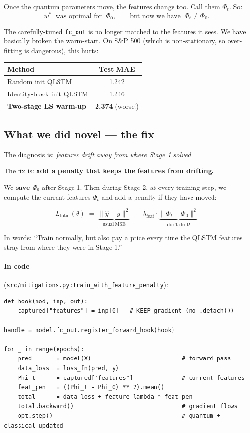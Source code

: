 \documentclass[11pt,a4paper]{article}
\begin{document}
Once the quantum parameters move, the features change too. Call them $\Phi_t$. So:
\[
  w^* \;\;\text{was optimal for}\;\; \Phi_0, \qquad \text{but now we have}\;\; \Phi_t \neq \Phi_0.
\]

The carefully-tuned \texttt{fc\_out} is no longer matched to the features it sees. We have basically broken the warm-start. On S\&P 500 (which is non-stationary, so over-fitting is dangerous), this hurts:

\begin{center}
\begin{tabular}{@{}lc@{}}
\toprule
\textbf{Method} & \textbf{Test MAE} \\
\midrule
Random init QLSTM         & 1.242 \\
Identity-block init QLSTM & 1.246 \\
\textbf{Two-stage LS warm-up} & \textbf{2.374} \;(worse!) \\
\bottomrule
\end{tabular}
\end{center}

\subsection{What we did novel --- the fix}

The diagnosis is: \emph{features drift away from where Stage 1 solved.}

The fix is: \textbf{add a penalty that keeps the features from drifting.}

We \textbf{save $\Phi_0$} after Stage 1. Then during Stage 2, at every training step, we compute the current features $\Phi_t$ and add a penalty if they have moved:

\[
  \boxed{\;
  L_{\text{total}}(\theta) \;=\;
  \underbrace{\|\hat y - y\|^2}_{\text{usual MSE}}
  \;+\;
  \lambda_{\text{feat}} \cdot \underbrace{\|\Phi_t - \Phi_0\|^2}_{\text{don't drift!}}
  \;}
\]

In words: ``Train normally, but also pay a price every time the QLSTM features stray from where they were in Stage 1.''

\paragraph{In code} (\texttt{src/mitigations.py:train\_with\_feature\_penalty}):
\begin{lstlisting}
def hook(mod, inp, out):
    captured["features"] = inp[0]   # KEEP gradient (no .detach())

handle = model.fc_out.register_forward_hook(hook)

for _ in range(epochs):
    pred       = model(X)                          # forward pass
    data_loss  = loss_fn(pred, y)
    Phi_t      = captured["features"]              # current features
    feat_pen   = ((Phi_t - Phi_0) ** 2).mean()
    total      = data_loss + feature_lambda * feat_pen
    total.backward()                               # gradient flows
    opt.step()                                     # quantum + classical updated
\end{lstlisting}
\end{document}

